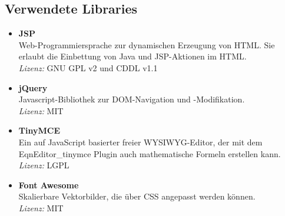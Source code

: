 \subsection{Verwendete Libraries}
\begin{itemize}
	\item \textbf{JSP} \\
	Web-Programmiersprache zur dynamischen Erzeugung von HTML. Sie erlaubt die Einbettung von Java und JSP-Aktionen im HTML. \\
	\textit{Lizenz:} GNU GPL v2 und CDDL v1.1
	\item \textbf{jQuery} \\
	Javascript-Bibliothek zur DOM-Navigation und -Modifikation.\\
	\textit{Lizenz:} MIT
	\item \textbf{TinyMCE} \\
	Ein auf JavaScript basierter freier WYSIWYG-Editor, der mit dem EqnEditor\_tinymce Plugin auch mathematische Formeln erstellen kann. \\
	\textit{Lizenz:} LGPL
	\item \textbf{Font Awesome} \\
	Skalierbare Vektorbilder, die über CSS angepasst werden können. \\
	\textit{Lizenz:} MIT
\end{itemize}

